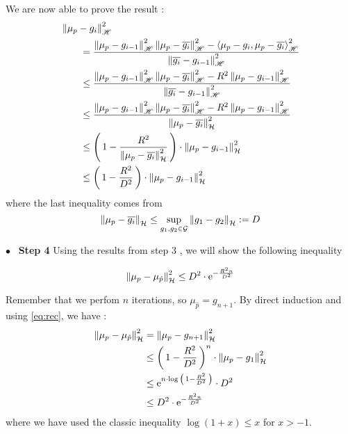 We are now able to prove the result :
\begin{align*}
&\left\| \mu_p-g_i \right\|_{ \mathscr { H }} ^ { 2 } \\ &\qquad= \frac { \left\| \mu_p-g_{i-1} \right\|_{ \mathscr { H }} ^ { 2 } \left\| \mu_p-\overline{g_i} \right\|_{ \mathscr { H }} ^ { 2 } - \left\langle \mu_p-g_i , \mu_p-\overline{g_i} \right\rangle_{ \mathscr { H }} ^ { 2 } } { \left\| \overline{g_i}-g_{i-1} \right\|_{ \mathscr { H }} ^ { 2 } }\\
&\qquad\leq \frac { \left\| \mu_p-g_{i-1} \right\|_{ \mathscr { H }} ^ { 2 } \left\| \mu_p-\overline{g_i} \right\|_{ \mathscr { H }} ^ { 2 } - R^2 \left\| \mu _ { p } - g _ { i - 1 } \right\| _ { \mathscr { H } }^2 } { \left\| \overline{g_i}-g_{i-1} \right\|_{ \mathscr { H }} ^ { 2 } }\\
&\qquad\leq \frac { \left\| \mu_p-g_{i-1} \right\|_{ \mathscr { H }} ^ { 2 } \left\| \mu_p-\overline{g_i} \right\|_{ \mathscr { H }} ^ { 2 } - R^2 \left\| \mu _ { p } - g _ { i - 1 } \right\| _ { \mathscr { H } }^2 } { \norme{\mu_p-\overline{g_i}}^2 }\\
&\qquad \leq \prt{1-\frac{R^2}{\norme{\mu_p-\overline{g_i}}^2}}\cdot \norme{\mu_p-g_{i-1}}^2\\
&\qquad \leq \prt{1-\frac{R^2}{D^2}}\cdot \norme{\mu_p-g_{i-1}}^2
\end{align*}
where the last inequality comes from
\begin{equation*}
  \norme{\mu_p-\overline{g_i}} \leq \sup_{g_1, g_2 \in \G}   \norme{g_1-g_2} :=D
\end{equation*}

  {$\bullet$~\normalfont\bfseries\color{myorange!90!black} Step 4 }
  Using the results from step $3$ , we will show the following inequality

  \begin{boxtheorem}
\begin{equation}
  \norme{\mu_p-\mu_{\hat{p}}}^2 \leq D^2 \cdot \e^{-\frac{R^2 n}{D^2}}
\end{equation}
  \end{boxtheorem}

Remember that we perfom $n$ iterations, so $\mu_{\hat{p}}=g_{n+1}$.
By direct induction and using \eqref{eq:rec}, we have :
\begin{align*}
  \norme{\mu_p-\mu_{\hat{p}}}^2 &= \norme{\mu_p-g_{n+1}}^2 \\
  &\leq \prt{1-\frac{R^2}{D^2}}^n \cdot \norme{\mu_p-g_{1}}^2\\
  &\leq \e^{n \cdot \log{\prt{1-\frac{R^2}{D^2}}}} \cdot D^2\\
  &\leq D^2 \cdot \e^{-\frac{R^2 n}{D^2}}
\end{align*}
where we have used the classic inequality $\log(1+x) \leq x$ for $x>-1$.

